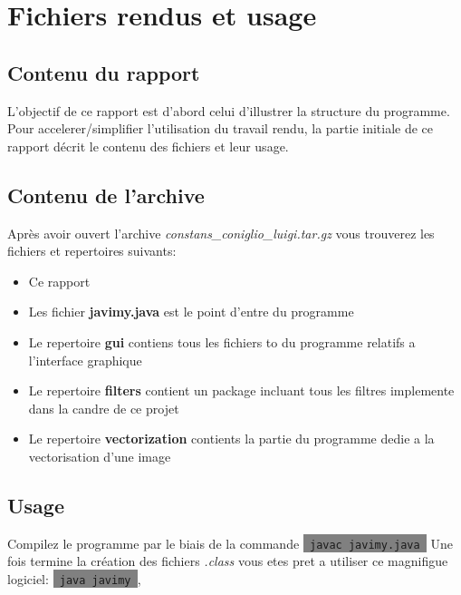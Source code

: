 \documentclass[twoside,openright,a4paper,11pt,french]{article}
\begin{document}
\pagestyle{plain}
\setlength{\parindent}{0pt}



\parskip=0pt
\tableofcontents


\vspace{5cm}


\section{Fichiers rendus et usage}
\subsection{Contenu du rapport}
L'objectif de ce rapport est d'abord celui d'illustrer la structure du
programme. Pour accelerer/simplifier l'utilisation du travail rendu, la partie
initiale de ce rapport décrit le contenu des fichiers et leur usage.

\subsection{Contenu de l'archive}
Après avoir ouvert l'archive {\it constans\_coniglio\_luigi.tar.gz} vous
trouverez les fichiers et repertoires suivants:
\smallbreak
\begin{itemize}
\item Ce rapport
\item Les fichier {\bf javimy.java} est le point d'entre du programme
\item Le repertoire {\bf gui} contiens tous les fichiers to du programme relatifs
      a l'interface graphique
\item Le repertoire {\bf filters} contient un package incluant tous les filtres 
      implemente dans la candre de ce projet
\item Le repertoire {\bf vectorization} contients la partie du programme dedie a
      la vectorisation d'une image
\end{itemize}

\bigbreak

\subsection{Usage}
Compilez le programme par le biais de la commande 
\colorbox{gray}{\lstinline[basicstyle=\ttfamily\color{black}]| javac javimy.java |}
Une fois termine la création des fichiers {\it .class} vous etes pret
a utiliser ce magnifigue logiciel: 
\colorbox{gray}{\lstinline[basicstyle=\ttfamily\color{black}]| java javimy |},
\end{document}
